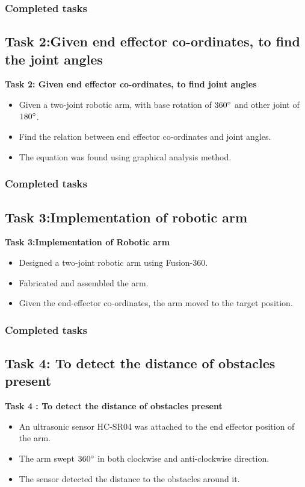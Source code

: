 \documentclass{beamer}
\begin{document}
\begin{frame}[fragile]
\frametitle{Completed tasks}
 \subsection{Task 2:Given end effector co-ordinates, to find the joint angles}
 \textbf{Task 2: Given end effector co-ordinates, to find joint angles}
 \begin{itemize}
 \item Given a two-joint robotic arm, with base rotation of $360\degree$ and other joint of $180\degree$.
 \item  Find the relation between end effector co-ordinates and joint angles.
 \item  The equation was found using graphical analysis method.
 \end{itemize}
\end{frame}

\begin{frame}[fragile]
\frametitle{Completed tasks}
\subsection{Task 3:Implementation of robotic arm}
\textbf{Task 3:Implementation of Robotic arm}
\begin{itemize}
\item Designed  a two-joint robotic arm using Fusion-360.
\item Fabricated and assembled the arm.
\item Given the end-effector co-ordinates, the arm moved to the target position.
\end{itemize}
\end{frame}

\begin{frame}[fragile]
\frametitle{Completed tasks}
\subsection{Task 4: To detect the distance of obstacles present}
\textbf{Task 4 : To detect the distance of obstacles present}
\begin{itemize}
\item An ultrasonic sensor  HC-SR04 was attached to the end effector position of the arm.
\item  The arm swept $360\degree$ in both clockwise and anti-clockwise direction.
\item The sensor detected the distance to the obstacles around it.
\end{itemize}
\end{frame}
\end{document}
